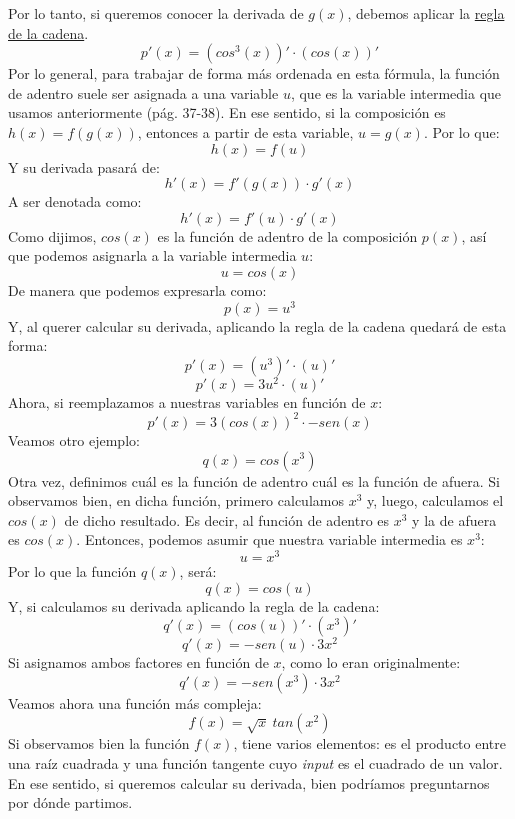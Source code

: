 \documentclass[12pt]{article}
\begin{document}
Por lo tanto, si queremos conocer la derivada de $g(x)$, debemos aplicar la \underline{regla de la cadena}.
\[p'(x) = (cos^{3}(x))' \cdot (cos(x))'\]
Por lo general, para trabajar de forma más ordenada en esta fórmula, la función de adentro suele ser asignada a una variable $u$, que es la variable intermedia que usamos anteriormente (pág. 37-38). En ese sentido, si la composición es $h(x) = f(g(x))$, entonces a partir de esta variable, $u = g(x)$. Por lo que:
\[h(x) = f(u)\]
Y su derivada pasará de:
\[h'(x) = f'(g(x)) \cdot g'(x)\]
A ser denotada como:
\[h'(x) = f'(u) \cdot g'(x)\]
Como dijimos, $cos(x)$ es la función de adentro de la composición $p(x)$, así que podemos asignarla a la variable intermedia $u$:
\[u = cos(x)\]
De manera que podemos expresarla como:
\[p(x) = u^{3}\]
Y, al querer calcular su derivada, aplicando la regla de la cadena quedará de esta forma:
\[p'(x) = (u^{3})' \cdot (u)'\]
\[p'(x) = 3u^{2} \cdot (u)'\]
Ahora, si reemplazamos a nuestras variables en función de $x$:
\[p'(x) = 3(cos(x))^{2} \cdot -sen(x)\]
Veamos otro ejemplo:
\[q(x) = cos(x^{3})\]
Otra vez, definimos cuál es la función de adentro cuál es la función de afuera. Si observamos bien, en dicha función, primero calculamos $x^{3}$ y, luego, calculamos el $cos(x)$ de dicho resultado. Es decir, al función de adentro es $x^{3}$ y la de afuera es $cos(x)$. Entonces, podemos asumir que nuestra variable intermedia es $x^{3}$:
\[u = x^{3}\]
Por lo que la función $q(x)$, será:
\[q(x) = cos(u)\]
Y, si calculamos su derivada aplicando la regla de la cadena:
\[q'(x) = (cos(u))' \cdot (x^{3})'\]
\[q'(x) = -sen(u) \cdot 3x^{2}\]
Si asignamos ambos factores en función de $x$, como lo eran originalmente:
\[q'(x) = -sen(x^{3}) \cdot 3x^{2}\]
Veamos ahora una función más compleja:
\[f(x) = \sqrt{x} \ tan(x^{2})\]
Si observamos bien la función $f(x)$, tiene varios elementos: es el producto entre una raíz cuadrada y una función tangente cuyo \textit{input} es el cuadrado de un valor. En ese sentido, si queremos calcular su derivada, bien podríamos preguntarnos por dónde partimos.
\end{document}
